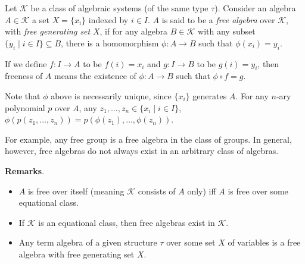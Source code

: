 \documentclass[12pt]{article}
\begin{document}
Let $\mathcal{K}$ be a class of algebraic systems (of the same type $\tau$).  Consider an algebra $A\in \mathcal{K}$  a set $X=\lbrace x_i\rbrace$ indexed by $i\in I$.  $A$ is said to be a \emph{free algebra} over $\mathcal{K}$, with \emph{free generating set} $X$, if for any algebra $B\in \mathcal{K}$ with any subset $\lbrace y_i\mid i\in I\rbrace \subseteq B$, there is a homomorphism $\phi:A\to B$ such that $\phi(x_i)=y_i$.

If we define $f:I\to A$ to be $f(i)=x_i$ and $g:I\to B$ to be $g(i)=y_i$, then freeness of $A$ means the existence of $\phi:A\to B$ such that $\phi\circ f=g$.

Note that $\phi$ above is necessarily unique, since $\lbrace x_i\rbrace$ generates $A$.  For any $n$-ary polynomial $p$ over $A$, any $z_1,\ldots,z_n \in \lbrace x_i\mid i\in I\rbrace$, $\phi(p(z_1,\ldots,z_n))=p(\phi(z_1),\ldots,\phi(z_n))$.

For example, any free group is a free algebra in the class of groups.  In general, however, free algebras do not always exist in an arbitrary class of algebras.

\textbf{Remarks}.  
\begin{itemize}
\item
$A$ is free over itself (meaning $\mathcal{K}$ consists of $A$ only) iff $A$ is free over some equational class.
\item
If $\mathcal{K}$ is an equational class, then free algebras exist in $\mathcal{K}$.
\item
Any term algebra of a given structure $\tau$ over some set $X$ of variables is a free algebra with free generating set $X$.
\end{itemize}
\end{document}
